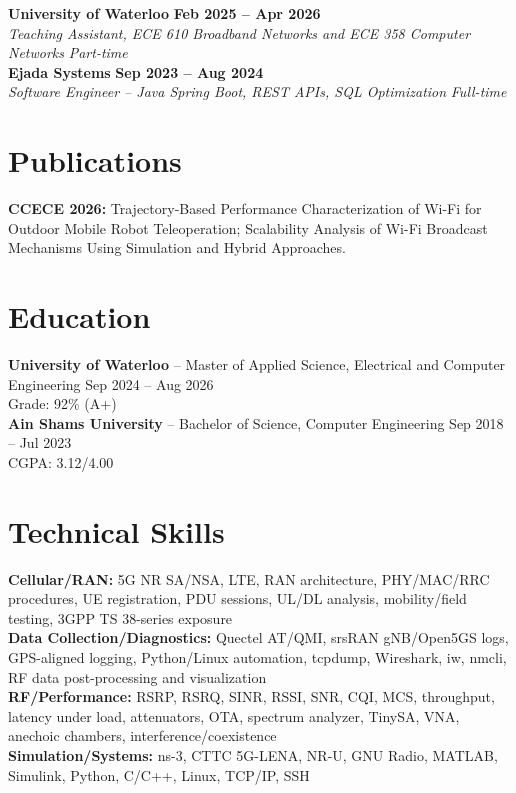 \documentclass[letterpaper,10pt]{article}
\newcommand{\resumeSubheading}[4]{
  \textbf{#1} \hfill \textbf{#2} \\
  \textit{#3} \hfill \textit{#4} \\
}
\begin{document}
\resumeSubheading
{University of Waterloo}{Feb 2025 -- Apr 2026}
{Teaching Assistant, ECE 610 Broadband Networks and ECE 358 Computer Networks}{Part-time}

\resumeSubheading
{Ejada Systems}{Sep 2023 -- Aug 2024}
{Software Engineer -- Java Spring Boot, REST APIs, SQL Optimization}{Full-time}

\section{Publications}

\textbf{CCECE 2026:} Trajectory-Based Performance Characterization of Wi-Fi for Outdoor Mobile Robot Teleoperation; Scalability Analysis of Wi-Fi Broadcast Mechanisms Using Simulation and Hybrid Approaches.

\section{Education}

\textbf{University of Waterloo} -- Master of Applied Science, Electrical and Computer Engineering \hfill Sep 2024 -- Aug 2026 \\
Grade: 92\% (A+) \\
\textbf{Ain Shams University} -- Bachelor of Science, Computer Engineering \hfill Sep 2018 -- Jul 2023 \\
CGPA: 3.12/4.00

\section{Technical Skills}

\textbf{Cellular/RAN:} 5G NR SA/NSA, LTE, RAN architecture, PHY/MAC/RRC procedures, UE registration, PDU sessions, UL/DL analysis, mobility/field testing, 3GPP TS 38-series exposure \\
\textbf{Data Collection/Diagnostics:} Quectel AT/QMI, srsRAN gNB/Open5GS logs, GPS-aligned logging, Python/Linux automation, tcpdump, Wireshark, iw, nmcli, RF data post-processing and visualization \\
\textbf{RF/Performance:} RSRP, RSRQ, SINR, RSSI, SNR, CQI, MCS, throughput, latency under load, attenuators, OTA, spectrum analyzer, TinySA, VNA, anechoic chambers, interference/coexistence \\
\textbf{Simulation/Systems:} ns-3, CTTC 5G-LENA, NR-U, GNU Radio, MATLAB, Simulink, Python, C/C++, Linux, TCP/IP, SSH
\end{document}
